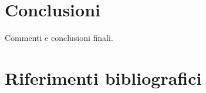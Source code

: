 \documentclass[a4paper, 10pt, oneside]{article}
\begin{document}

\newpage
\section{Conclusioni}
\label{conclusioni}
\renewcommand{\refname}{}

Commenti e conclusioni finali.


\newpage
\section{Riferimenti bibliografici}
\label{riferimenti}
\renewcommand{\refname}{}
 

\end{document}
